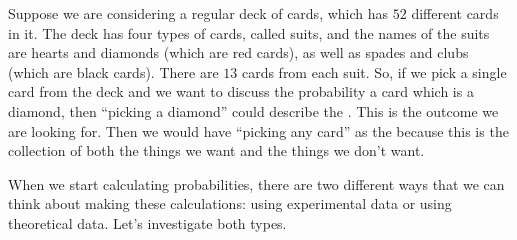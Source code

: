\documentclass{ximera}
\begin{document}
\begin{example}
Suppose we are considering a regular deck of cards, which has $52$ different cards in it. The deck has four types of cards, called suits, and the names of the suits are hearts and diamonds (which are red cards), as well as spades and clubs (which are black cards). There are $13$ cards from each suit. So, if we pick a single card from the deck and we want to discuss the probability a card which is a diamond, then ``picking a diamond'' could describe the . This is the outcome we are looking for. Then we would have ``picking any card'' as the  because this is the collection of both the things we want and the things we don't want.
\end{example}

When we start calculating probabilities, there are two different ways that we can think about making these calculations: using experimental data or using theoretical data. Let's investigate both types.
\end{document}
